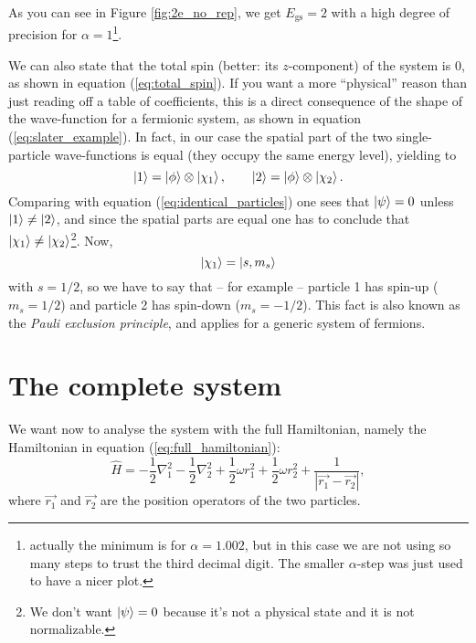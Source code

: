As you can see in Figure \ref{fig:2e_no_rep}, we get $E_{\text{gs}} = 2$ with a high degree of precision for $\alpha=1$\footnote{actually the minimum is for $\alpha=1.002$, but in this case we are not using so many steps to trust the third decimal digit. The smaller $\alpha$-step was just used to have a nicer plot.}.

We can also state that the total spin (better: its $z$-component) of the system is 0, as shown in equation (\ref{eq:total_spin}). If you want a more ``physical'' reason than just reading off a table of coefficients, this is a direct consequence of the shape of the wave-function for a fermionic system, as shown in equation (\ref{eq:slater_example}). In fact, in our case the spatial part of the two single-particle wave-functions is equal (they occupy the same energy level), yielding to
\begin{equation}
	\Ket{1} = \Ket{\phi}\otimes\Ket{\chi_1},
	\qquad
	\Ket{2} = \Ket{\phi}\otimes\Ket{\chi_2}.
\end{equation}
Comparing with equation (\ref{eq:identical_particles}) one sees that $\Ket{\psi} = 0$ unless $\Ket{1} \neq \Ket{2}$, and since the spatial parts are equal one has to conclude that $\Ket{\chi_1} \neq \Ket{\chi_2}$\footnote{We don't want $\Ket{\psi} = 0$ because it's not a physical state and it is not normalizable.}. Now, 
\begin{equation}
	\Ket{\chi_1} = \Ket{s,m_s}
\end{equation}
with $s=1/2$, so we have to say that -- for example -- particle 1 has spin-up ($m_s=1/2$) and particle 2 has spin-down ($m_s=-1/2$). This fact is also known as the \emph{Pauli exclusion principle}, and applies for a generic system of fermions.

\section{The complete system}
We want now to analyse the system with the full Hamiltonian, namely the Hamiltonian in equation (\ref{eq:full_hamiltonian}):
\begin{equation}
	\hat{H}=-\frac{1}{2} \nabla^2_1 - \frac{1}{2} \nabla^2_2+\frac{1}{2}\omega r_1^2+\frac{1}{2}\omega r_2^2+ \frac{1}{|\vec{r_1}-\vec{r_2}|},
\end{equation}
where $\vec{r_1}$ and $\vec{r_2}$ are the position operators of the two particles.

